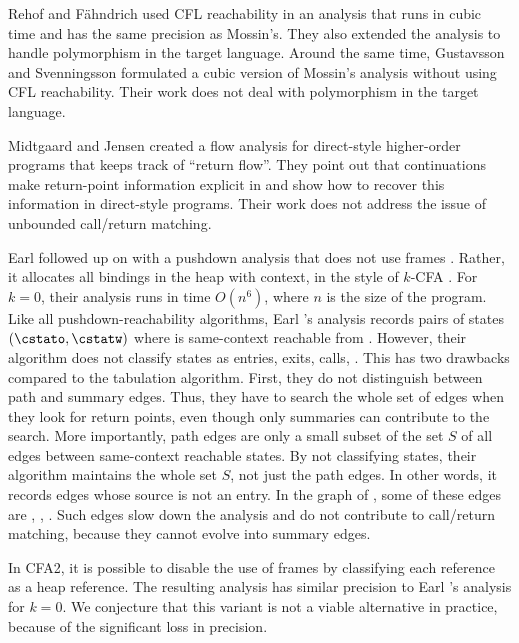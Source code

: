 \documentclass{LMCS}
\theoremstyle{definition} \newtheorem{property}[thm]{Property}
\begin{document}
Rehof and F\"ahndrich \cite{conf/popl/01/rehof/typeflow, 
journal/mscs/08/fahndrich/typeflow} used CFL reachability in an analysis that
runs in cubic time and has the same precision as Mossin's.
They also extended the analysis to handle polymorphism in the target language.
Around the same time, Gustavsson and Svenningsson 
\cite{conf/pado/01/gustavsson/constr} formulated a cubic version of Mossin's
analysis without using CFL reachability.
Their work does not deal with polymorphism in the target language.

Midtgaard and Jensen \cite{conf/icfp/09/midtgaard/directCallRet} created 
a flow analysis for direct-style higher-order programs that keeps track of
``return flow''.
They point out that continuations make return-point information explicit
in \cps{} and show how to recover this information in direct-style programs.
Their work does not address the issue of unbounded call/return matching.

Earl \etal{} followed up on \cfat{} with a pushdown analysis that does not use 
frames \cite{conf/sfp/10/earl/pdcfa}.
Rather, it allocates all bindings in the heap with context, in the style of 
$k$-CFA \cite{diss/cmu/91/olin}.
For $k = 0$, their analysis runs in time $O(n^6)$, where $n$ is the size of the
program.
Like all pushdown-reachability algorithms, Earl \etal's analysis records pairs
of states $(\cstato, \cstatw)$ where \cstatw{} is same-context reachable from
\cstato.
However, their algorithm does not classify states as entries, exits, calls, 
\etc.
This has two drawbacks compared to the tabulation algorithm.
First, they do not distinguish between path and summary edges.
Thus, they have to search the whole set of edges when they look for return 
points, even though only summaries can contribute to the search.
More importantly, path edges are only a small subset of the set $S$ of all edges
between same-context reachable states.
By not classifying states, their algorithm maintains the whole set $S$, not just
the path edges.
In other words, it records edges whose source is not an entry.
In the graph of , some of these edges are , , 
.
Such edges slow down the analysis and do not contribute to call/return matching,
because they cannot evolve into summary edges.

In CFA2, it is possible to disable the use of frames by classifying each 
reference as a heap reference.
The resulting analysis has similar precision to Earl \etal's analysis for $k=0$.
We conjecture that this variant is not a viable alternative in practice, because
of the significant loss in precision.
\end{document}
